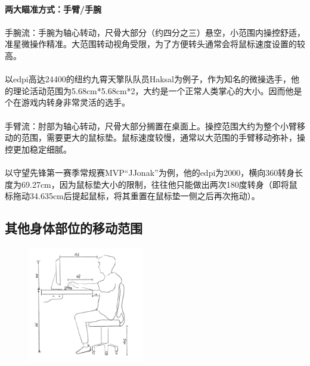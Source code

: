 \documentclass[UTF8]{ctexart}
\begin{document}
    \paragraph{两大瞄准方式：手臂/手腕}
    \paragraph{}手腕流：手腕为轴心转动，尺骨大部分（约四分之三）悬空，小范围内操控舒适，准星微操作精准。大范围转动视角受限，为了方便转头通常会将鼠标速度设置的较高。

    \paragraph{}
    以edpi高达24400的纽约九霄天擎队队员Haksal为例子，作为知名的微操选手，他的理论活动范围为5.68cm*5.68cm*2，大约是一个正常人类掌心的大小。因而他是个在游戏内转身非常灵活的选手。
    \paragraph{}
    手臂流：肘部为轴心转动，尺骨大部分搁置在桌面上。操控范围大约为整个小臂移动的范围，需要更大的鼠标垫。鼠标速度较慢，通常以大范围的手臂移动弥补，操控更加稳定细腻。
    \paragraph{}
    以守望先锋第一赛季常规赛MVP“JJonak”为例，他的edpi为2000，横向360转身长度为69.27cm，因为鼠标垫大小的限制，往往他只能做出两次180度转身（即将鼠标拖动34.635cm后提起鼠标，将其重置在鼠标垫一侧之后再次拖动）。
    \cite{zhihu_liupai}
\subsection{其他身体部位的移动范围}
    \begin{figure}[htbp]
        \centering
        \includegraphics[width=0.45\textwidth]{desktop.jpg}
    \end{figure}
\end{document}
